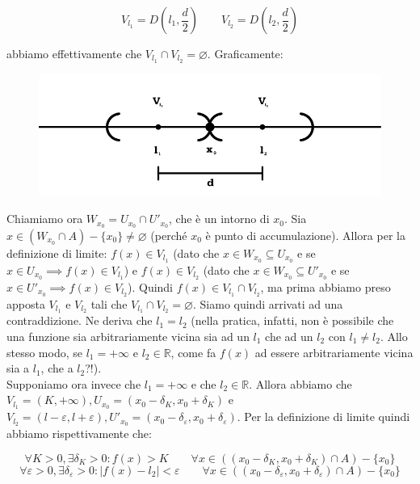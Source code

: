 \documentclass{article}
\begin{document}
\begin{equation*}
    V_{l_1} = D\left(l_1, \frac{d}{2}\right) \qquad V_{l_2} = D\left(l_2, \frac{d}{2}\right)
\end{equation*}

\noindent abbiamo effettivamente che $V_{l_1} \cap V_{l_2} = \varnothing$. Graficamente:

\begin{figure}[!h]
    \centering
    \includegraphics[width=12cm]{./images/interval3.pdf}
\end{figure}

\noindent Chiamiamo ora $W_{x_0} = U_{x_0} \cap U'_{x_0}$, che è un intorno di $x_0$. Sia $x \in (W_{x_0} \cap A) - \{x_0\} \neq \varnothing$ (perché $x_0$ è punto di accumulazione). Allora per la definizione di limite: $f(x) \in V_{l_1}$ (dato che $x \in W_{x_0} \subseteq U_{x_0}$ e se $x \in U_{x_0} \implies f(x) \in V_{l_1}$) e $f(x) \in V_{l_2}$ (dato che $x \in W_{x_0} \subseteq U'_{x_0}$ e se $x \in U'_{x_0} \implies f(x) \in V_{l_2}$). Quindi $f(x) \in V_{l_1} \cap V_{l_2}$, ma prima abbiamo preso apposta $V_{l_1}$ e $V_{l_2}$ tali che $V_{l_1} \cap V_{l_2} = \varnothing$. Siamo quindi arrivati ad una contraddizione. Ne deriva che $l_1 = l_2$ (nella pratica, infatti, non è possibile che una funzione sia arbitrariamente vicina sia ad un $l_1$ che ad un $l_2$ con $l_1 \neq l_2$. Allo stesso modo, se $l_1 = + \infty$ e $l_2 \in \mathbb{R}$, come fa $f(x)$ ad essere arbitrariamente vicina sia a $l_1$, che a $l_2$?!).\\

\noindent Supponiamo ora invece che $l_1 = +\infty$ e che $l_2 \in \mathbb{R}$. Allora abbiamo che $V_{l_1} = (K, + \infty), U_{x_0} = (x_0 - \delta_K, x_0 + \delta_K)$ e $V_{l_2} = (l - \varepsilon, l + \varepsilon), U'_{x_0} = (x_0 - \delta_\varepsilon, x_0 + \delta_\varepsilon)$. Per la definizione di limite quindi abbiamo rispettivamente che: 

\begin{equation*}
    \forall K > 0, \exists \delta_K > 0 : f(x) > K \qquad \forall x \in ((x_0 - \delta_K, x_0 + \delta_K) \cap A) - \{x_0\}
\end{equation*}
\begin{equation*}
    \forall \varepsilon > 0, \exists \delta_\varepsilon > 0 : |f(x) - l_2| < \varepsilon \qquad \forall x \in ((x_0 - \delta_\varepsilon, x_0 + \delta_\varepsilon) \cap A) - \{x_0\}
\end{equation*}
\end{document}
